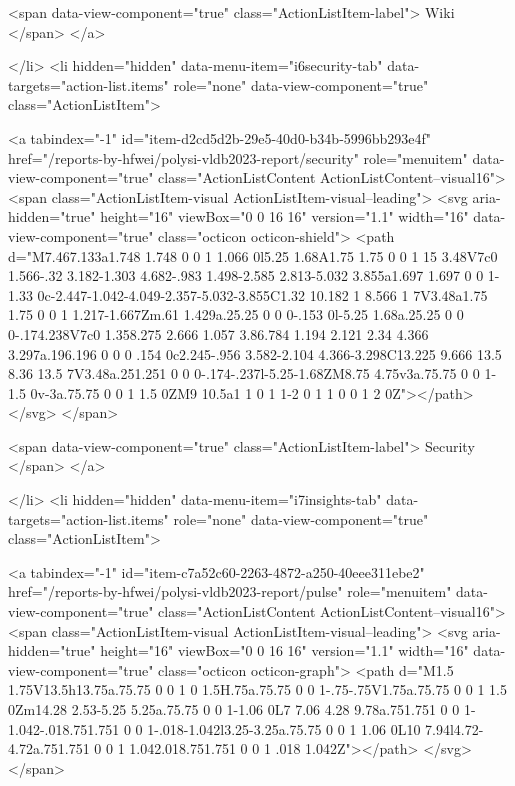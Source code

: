 {{        <span data-view-component="true" class="ActionListItem-label">
          Wiki
</span>      
</a>
  
</li>
        <li hidden="hidden" data-menu-item="i6security-tab" data-targets="action-list.items" role="none" data-view-component="true" class="ActionListItem">
    
    
    <a tabindex="-1" id="item-d2cd5d2b-29e5-40d0-b34b-5996bb293e4f" href="/reports-by-hfwei/polysi-vldb2023-report/security" role="menuitem" data-view-component="true" class="ActionListContent ActionListContent--visual16">
        <span class="ActionListItem-visual ActionListItem-visual--leading">
          <svg aria-hidden="true" height="16" viewBox="0 0 16 16" version="1.1" width="16" data-view-component="true" class="octicon octicon-shield">
    <path d="M7.467.133a1.748 1.748 0 0 1 1.066 0l5.25 1.68A1.75 1.75 0 0 1 15 3.48V7c0 1.566-.32 3.182-1.303 4.682-.983 1.498-2.585 2.813-5.032 3.855a1.697 1.697 0 0 1-1.33 0c-2.447-1.042-4.049-2.357-5.032-3.855C1.32 10.182 1 8.566 1 7V3.48a1.75 1.75 0 0 1 1.217-1.667Zm.61 1.429a.25.25 0 0 0-.153 0l-5.25 1.68a.25.25 0 0 0-.174.238V7c0 1.358.275 2.666 1.057 3.86.784 1.194 2.121 2.34 4.366 3.297a.196.196 0 0 0 .154 0c2.245-.956 3.582-2.104 4.366-3.298C13.225 9.666 13.5 8.36 13.5 7V3.48a.251.251 0 0 0-.174-.237l-5.25-1.68ZM8.75 4.75v3a.75.75 0 0 1-1.5 0v-3a.75.75 0 0 1 1.5 0ZM9 10.5a1 1 0 1 1-2 0 1 1 0 0 1 2 0Z"></path>
</svg>
        </span>
      
        <span data-view-component="true" class="ActionListItem-label">
          Security
</span>      
</a>
  
</li>
        <li hidden="hidden" data-menu-item="i7insights-tab" data-targets="action-list.items" role="none" data-view-component="true" class="ActionListItem">
    
    
    <a tabindex="-1" id="item-c7a52c60-2263-4872-a250-40eee311ebe2" href="/reports-by-hfwei/polysi-vldb2023-report/pulse" role="menuitem" data-view-component="true" class="ActionListContent ActionListContent--visual16">
        <span class="ActionListItem-visual ActionListItem-visual--leading">
          <svg aria-hidden="true" height="16" viewBox="0 0 16 16" version="1.1" width="16" data-view-component="true" class="octicon octicon-graph">
    <path d="M1.5 1.75V13.5h13.75a.75.75 0 0 1 0 1.5H.75a.75.75 0 0 1-.75-.75V1.75a.75.75 0 0 1 1.5 0Zm14.28 2.53-5.25 5.25a.75.75 0 0 1-1.06 0L7 7.06 4.28 9.78a.751.751 0 0 1-1.042-.018.751.751 0 0 1-.018-1.042l3.25-3.25a.75.75 0 0 1 1.06 0L10 7.94l4.72-4.72a.751.751 0 0 1 1.042.018.751.751 0 0 1 .018 1.042Z"></path>
</svg>
        </span>
      
}}
